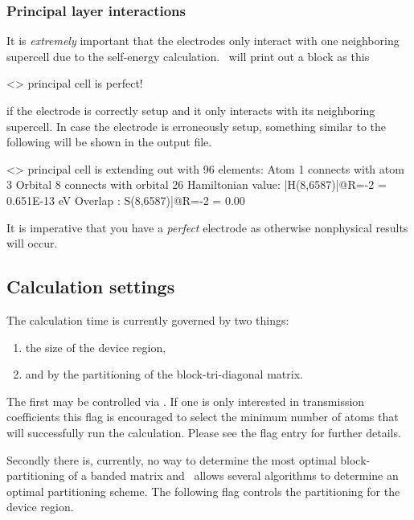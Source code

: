 \subsubsection{Principal layer interactions} %
%

It is \emph{extremely} important that the electrodes only interact
with one neighboring supercell due to the self-energy
calculation. \tbtrans\ will print out a block as this
\begin{fdfexample}
 <> principal cell is perfect!
\end{fdfexample}
if the electrode is correctly setup and it only interacts with its
neighboring supercell.
%
In case the electrode is erroneously setup, something similar to the
following will be shown in the output file.
\begin{fdfexample}
 <> principal cell is extending out with 96 elements:
    Atom 1 connects with atom 3
    Orbital 8 connects with orbital 26
    Hamiltonian value: |H(8,6587)|@R=-2 =  0.651E-13 eV
    Overlap          :  S(8,6587)|@R=-2 =   0.00    
\end{fdfexample}
It is imperative that you have a \emph{perfect} electrode as otherwise
nonphysical results will occur.


\subsection{Calculation settings}

The calculation time is currently governed by two things:
\begin{enumerate}
  
  \item%
  the size of the device region, 

  \item%
  and by the partitioning of the block-tri-diagonal matrix.
  
\end{enumerate}
The first may be controlled via . If one is only
interested in transmission coefficients this flag is encouraged to
select the minimum number of atoms that will successfully run the
calculation. Please see the flag entry for further details.

Secondly there is, currently, no way to determine the most optimal
block-partitioning of a banded matrix and \tbtrans\ allows several
algorithms to determine an optimal partitioning scheme. The following
flag controls the partitioning for the device region.


